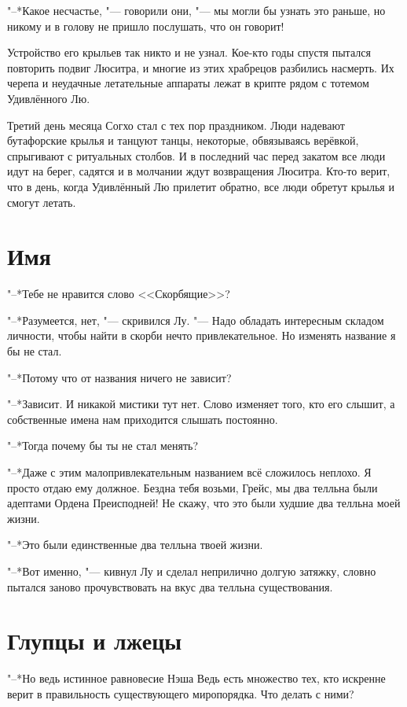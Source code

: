 "--*Какое несчастье, "--- говорили они, "--- мы могли бы узнать это раньше, но никому и в голову не пришло послушать, что он говорит!

Устройство его крыльев так никто и не узнал.
Кое-кто годы спустя пытался повторить подвиг Люситра, и многие из этих храбрецов разбились насмерть.
Их черепа и неудачные летательные аппараты лежат в крипте рядом с тотемом Удивлённого Лю.

Третий день месяца Согхо стал с тех пор праздником.
Люди надевают бутафорские крылья и танцуют танцы, некоторые, обвязываясь верёвкой, спрыгивают с ритуальных столбов.
И в последний час перед закатом все люди идут на берег, садятся и в молчании ждут возвращения Люситра.
Кто-то верит, что в день, когда Удивлённый Лю прилетит обратно, все люди обретут крылья и смогут летать.

\section{Имя}

"--*Тебе не нравится слово <<Скорбящие>>?

"--*Разумеется, нет, "--- скривился Лу.
"--- Надо обладать интересным складом личности, чтобы найти в скорби нечто привлекательное.
Но изменять название я бы не стал.

"--*Потому что от названия ничего не зависит?

"--*Зависит.
И никакой мистики тут нет.
Слово изменяет того, кто его слышит, а собственные имена нам приходится слышать постоянно.

"--*Тогда почему бы ты не стал менять?

"--*Даже с этим малопривлекательным названием всё сложилось неплохо.
Я просто отдаю ему должное.
Бездна тебя возьми, Грейс, мы два телльна были адептами Ордена Преисподней!
Не скажу, что это были худшие два телльна моей жизни.

"--*Это были единственные два телльна твоей жизни.

"--*Вот именно, "--- кивнул Лу и сделал неприлично долгую затяжку, словно пытался заново прочувствовать на вкус два телльна существования.

\section{Глупцы и лжецы}

"--*Но ведь истинное равновесие Нэша\ldotst
Ведь есть множество тех, кто искренне верит в правильность существующего миропорядка.
Что делать с ними?

